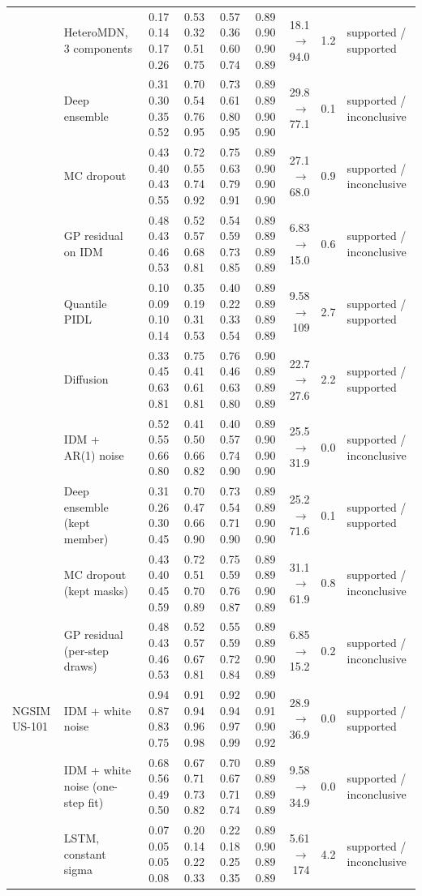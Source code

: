 \begin{longtable}{llrrrrrrl}
 & HeteroMDN, 3 components & 0.17 0.14 0.17 0.26 & 0.53 0.32 0.51 0.75 & 0.57 0.36 0.60 0.74 & 0.89 0.90 0.90 0.89 & 18.1 $\rightarrow$ 94.0 & 1.2 & supported / supported \\
 & Deep ensemble & 0.31 0.30 0.35 0.52 & 0.70 0.54 0.76 0.95 & 0.73 0.61 0.80 0.95 & 0.89 0.89 0.90 0.90 & 29.8 $\rightarrow$ 77.1 & 0.1 & supported / inconclusive \\
 & MC dropout & 0.43 0.40 0.43 0.55 & 0.72 0.55 0.74 0.92 & 0.75 0.63 0.79 0.91 & 0.89 0.90 0.90 0.90 & 27.1 $\rightarrow$ 68.0 & 0.9 & supported / inconclusive \\
 & GP residual on IDM & 0.48 0.43 0.46 0.53 & 0.52 0.57 0.68 0.81 & 0.54 0.59 0.73 0.85 & 0.89 0.89 0.89 0.89 & 6.83 $\rightarrow$ 15.0 & 0.6 & supported / inconclusive \\
 & Quantile PIDL & 0.10 0.09 0.10 0.14 & 0.35 0.19 0.31 0.53 & 0.40 0.22 0.33 0.54 & 0.89 0.89 0.89 0.89 & 9.58 $\rightarrow$ 109 & 2.7 & supported / supported \\
 & Diffusion & 0.33 0.45 0.63 0.81 & 0.75 0.41 0.61 0.81 & 0.76 0.46 0.63 0.80 & 0.90 0.89 0.89 0.89 & 22.7 $\rightarrow$ 27.6 & 2.2 & supported / supported \\
 & IDM + AR(1) noise & 0.52 0.55 0.66 0.80 & 0.41 0.50 0.66 0.82 & 0.40 0.57 0.74 0.90 & 0.89 0.90 0.90 0.90 & 25.5 $\rightarrow$ 31.9 & 0.0 & supported / inconclusive \\
 & Deep ensemble (kept member) & 0.31 0.26 0.30 0.45 & 0.70 0.47 0.66 0.90 & 0.73 0.54 0.71 0.90 & 0.89 0.89 0.90 0.90 & 25.2 $\rightarrow$ 71.6 & 0.1 & supported / supported \\
 & MC dropout (kept masks) & 0.43 0.40 0.45 0.59 & 0.72 0.51 0.70 0.89 & 0.75 0.59 0.76 0.87 & 0.89 0.89 0.90 0.89 & 31.1 $\rightarrow$ 61.9 & 0.8 & supported / inconclusive \\
 & GP residual (per-step draws) & 0.48 0.43 0.46 0.53 & 0.52 0.57 0.67 0.81 & 0.55 0.59 0.72 0.84 & 0.89 0.89 0.90 0.89 & 6.85 $\rightarrow$ 15.2 & 0.2 & supported / inconclusive \\
\midrule
NGSIM US-101 & IDM + white noise & 0.94 0.87 0.83 0.75 & 0.91 0.94 0.96 0.98 & 0.92 0.94 0.97 0.99 & 0.90 0.91 0.90 0.92 & 28.9 $\rightarrow$ 36.9 & 0.0 & supported / supported \\
 & IDM + white noise (one-step fit) & 0.68 0.56 0.49 0.50 & 0.67 0.71 0.73 0.82 & 0.70 0.67 0.71 0.74 & 0.89 0.89 0.89 0.89 & 9.58 $\rightarrow$ 34.9 & 0.0 & supported / inconclusive \\
 & LSTM, constant sigma & 0.07 0.05 0.05 0.08 & 0.20 0.14 0.22 0.33 & 0.22 0.18 0.25 0.35 & 0.89 0.90 0.89 0.89 & 5.61 $\rightarrow$ 174 & 4.2 & supported / inconclusive \\

\end{longtable}
